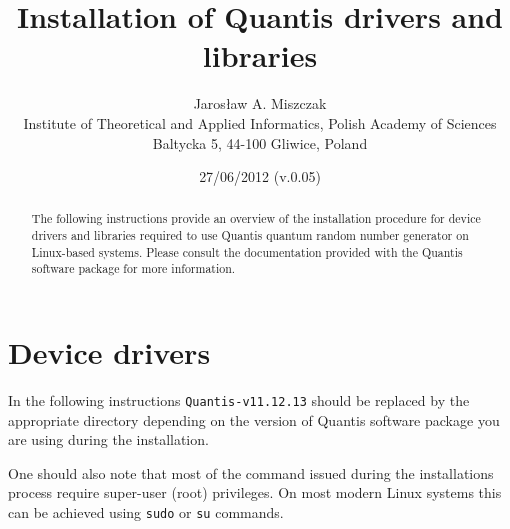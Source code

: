 \documentclass[a4paper,11pt]{article}
\title{Installation of Quantis drivers and libraries}
\author{Jaros{\l}aw A. Miszczak\\
Institute of Theoretical and Applied Informatics, Polish Academy of Sciences\\
Baltycka 5, 44-100 Gliwice, Poland}
\date{27/06/2012 (v.0.05)}
\newcommand{\QuantisDistVersion}{Quantis-v11.12.13}
\begin{document}
\maketitle

\begin{abstract}
The following instructions provide an overview of the installation procedure for
device drivers and libraries required to use Quantis quantum random number
generator on Linux-based systems. Please consult the documentation provided with
the Quantis software package for more information.
\end{abstract}

\section{Device drivers}

In the following instructions \texttt{\QuantisDistVersion } should be replaced
by the appropriate directory depending on the version of Quantis software
package you are using during the installation.

One should also note that most of the command issued during the installations
process require super-user (root) privileges. On most modern Linux systems
this can be achieved using \texttt{sudo} or \texttt{su} commands.

\end{document}
